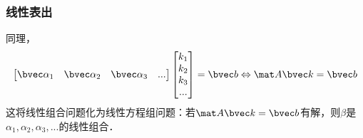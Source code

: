 \subsubsection{线性表出}
同理，
$$
\begin{bmatrix}
\bvec \alpha_1& \bvec \alpha_2& \bvec \alpha_3&...
\end{bmatrix}
\begin{bmatrix}
k_{1}\\
k_{2}\\
k_{3}\\
...\\
\end{bmatrix}
=
\bvec b
\Leftrightarrow 
\mat A \bvec k = \bvec b
$$
这将线性组合问题化为线性方程组问题：若$\mat A \bvec k = \bvec b$有解，则$\beta$是$\alpha_1, \alpha_2,\alpha_3,...$的线性组合．
